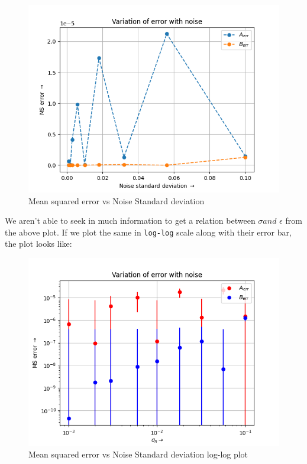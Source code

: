 \documentclass[11pt, a4paper]{article}
\begin{document}
\begin{figure}[!tbh]
   	\centering
   	\includegraphics[scale=0.5]{figure3.png} 
   	\caption{Mean squared error vs Noise Standard deviation}
   	\label{fig:fig4}
   \end{figure} 

We aren't able to seek in much information to get a relation between $\sigma and$ $\epsilon$ from the above plot. If we plot the same in \texttt{log-log} scale along with their error bar, the plot looks like:

\begin{figure}[!tbh]
   	\centering
   	\includegraphics[scale=0.5]{figure4.png} 
   	\caption{Mean squared error vs Noise Standard deviation log-log plot}
   	\label{fig:fig5}
   \end{figure} 
 
\end{document}
